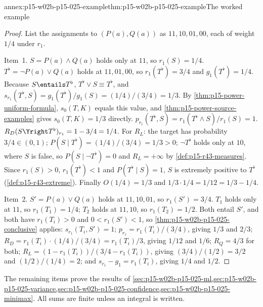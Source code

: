 \begin{annexitem}{annex:p15-w02b-p15-025-example}{thm:p15-w02b-p15-025-example}{The worked example}
\begin{proof}
List the assignments to \((P(a),Q(a))\) as \(11,10,01,00\), each of
weight \(1/4\) under \(r_1\).

Item~1. \(S=P(a)\wedge Q(a)\) holds only at \(11\), so \(r_1(S)=1/4\).
\(T^\flat=\neg P(a)\vee Q(a)\) holds at \(11,01,00\), so
\(r_1(T^\flat)=3/4\) and \(g_1(T^\flat)=1/4\). Because \(S\entails
T^\flat\), \(T^\flat\vee S\equiv T^\flat\), and
\(s_{r_1}(T^\flat,S)=g_1(T^\flat)/g_1(S)=(1/4)/(3/4)=1/3\). By
\cref{thm:p15-power-uniform-formula}, \(s_0(T,K)\) equals this value,
and \cref{thm:p15-power-source-examples} gives \(s_0(T,K)=1/3\)
directly. \(p_{r_1}(T^\flat,S)=r_1(T^\flat\wedge S)/r_1(S)=1\).
\(R_D(S\Yright T^\flat)_{r_1}=1-3/4=1/4\). For \(R_L\): the target has
probability \(3/4\in(0,1)\); \(P(S\mid T^\flat)=(1/4)/(3/4)=1/3>0\);
\(\neg T^\flat\) holds only at \(10\), where \(S\) is false, so
\(P(S\mid\neg T^\flat)=0\) and \(R_L=+\infty\) by
\cref{def:p15-r43-measures}. Since \(r_1(S)>0\), \(r_1(T^\flat)<1\) and
\(P(T^\flat\mid S)=1\), \(S\) is extremely positive to \(T^\flat\)
(\cref{def:p15-r43-extreme}). Finally \(O(1/4)=1/3\) and
\(1/3\cdot1/4=1/12=1/3-1/4\).

Item~2. \(S'=P(a)\vee Q(a)\) holds at \(11,10,01\), so
\(r_1(S')=3/4\). \(T_1\) holds only at \(11\), so \(r_1(T_1)=1/4\);
\(T_2\) holds at \(11,10\), so \(r_1(T_2)=1/2\). Both entail \(S'\),
and both have \(r_1(T_i)>0\) and \(0<r_1(S')<1\), so
\cref{thm:p15-w02b-p15-025-conclusive} applies:
\(s_{r_1}(T_i,S')=1\); \(p_{r_1}=r_1(T_i)/(3/4)\), giving \(1/3\) and
\(2/3\); \(R_D=r_1(T_i)\cdot(1/4)/(3/4)=r_1(T_i)/3\), giving \(1/12\)
and \(1/6\); \(R_Q=4/3\) for both; \(R_L=(1-r_1(T_i))/(3/4-r_1(T_i))\),
giving \((3/4)/(1/2)=3/2\) and \((1/2)/(1/4)=2\); and
\(s_{r_1}-g_1=r_1(T_i)\), giving \(1/4\) and \(1/2\).
\end{proof}
\end{annexitem}

The remaining items prove the results of
\cref{sec:p15-w02b-p15-025-ml,sec:p15-w02b-p15-025-variance,sec:p15-w02b-p15-025-confidence,sec:p15-w02b-p15-025-minimax}.
All sums are finite unless an integral is written.


